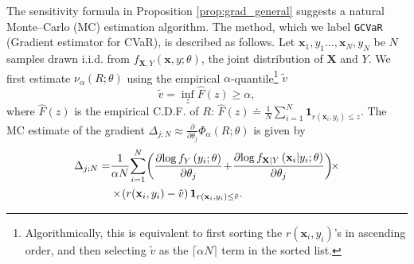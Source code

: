 \documentclass[letterpaper]{article}
\newcommand{\cvar}{\Phi_\alpha}
\newcommand{\var}{\nu_\alpha}
\newcommand{\bx}{\mathbf{x}}
\newcommand{\bX}{\mathbf{X}}
\newcommand{\Dth}{\frac{\partial}{\partial \theta_j}}
\newcommand{\Dt}[1]{\frac{\partial {#1}}{\partial \theta_j}}
\newcommand{\dcvar}{\Delta_{j;N}} %
\newcommand{\evar}{\tilde{v}}  %
\begin{document}
The sensitivity formula in Proposition \ref{prop:grad_general} suggests a natural Monte--Carlo (MC) estimation algorithm. The method, which we label \texttt{GCVaR} (Gradient estimator for CVaR), is described as follows. Let $\bx_{1},y_1\dots,\bx_{N},y_N$ be $N$ samples drawn i.i.d. from $f_{\bX,Y}(\bx,y;\theta)$, the joint distribution of $\bX$ and $Y$.
We first estimate $\var(R;\theta)$ using the empirical $\alpha$-quantile\footnote{Algorithmically, this is equivalent to first sorting the $r(\bx_i,y_i)$'s in ascending order, and then selecting $\evar$ as the $\lceil \alpha N \rceil$ term in the sorted list.} $\evar$
\begin{equation}\label{eq:empirical_VaR}
\evar = \inf_z \hat{F}(z) \geq \alpha,
\end{equation}
where $\hat{F}(z)$ is the empirical C.D.F. of $R$:
$
\hat{F}(z) \doteq \frac{1}{N} \sum_{i=1}^{N} \mathbf{1}_{r(\bx_{i},y_i)\leq z}.
$
The MC estimate of the gradient $\dcvar \approx \Dth\cvar (R;\theta)$ is given by
\begin{equation}\label{eq:simple_alg}
\begin{split}
\dcvar =& \frac{1}{\alpha N}\!\sum_{i=1}^{N} \!\left(\Dt{ \log f_{Y}\left(y_i;\theta\right)} \!+\! \Dt{ \log f_{\bX|Y}\left(\bx_{i}|y_i;\theta\right)}\right) \!\!\times\\
& \times\! \left( r(\bx_{i},y_i)-\evar \right) \mathbf{1}_{r(\bx_{i},y_i)\leq \evar}.
\end{split}\raisetag{0.8\baselineskip}
\end{equation}
\end{document}
